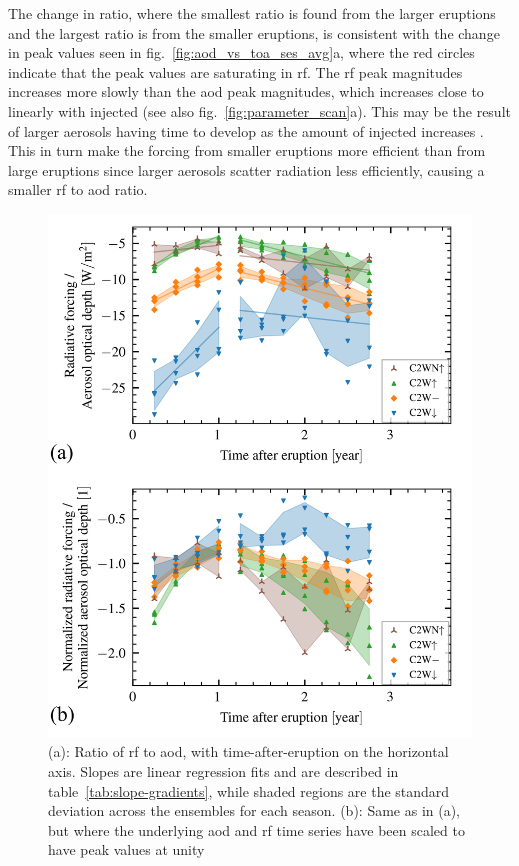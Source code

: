 \documentclass{ametsocV6.1}
\begin{document}
The change in ratio, where the smallest ratio is found from the larger eruptions and the
largest ratio is from the smaller eruptions, is consistent with the change in peak
values seen in fig.~\ref{fig:aod_vs_toa_ses_avg}a, where the red circles indicate that
the peak values are saturating in \gls{rf}. The \gls{rf} peak magnitudes increases more
slowly than the \gls{aod} peak magnitudes, which increases close to linearly with
injected  (see also fig.~\ref{fig:parameter_scan}a). This may be the result of
larger aerosols having time to develop as the amount of injected  increases
\citep{niemeier2015,marshall2019}. This in turn make the forcing from smaller eruptions
more efficient than from large eruptions since larger aerosols scatter radiation less
efficiently, causing a smaller \gls{rf} to \gls{aod} ratio.

\begin{figure}
  \centering
  \includegraphics[width=0.95\linewidth]{figures/aod_vs_toa_loop.png}

  \caption{(a): Ratio of \gls{rf} to \gls{aod}, with time-after-eruption on the horizontal
    axis. Slopes are linear regression fits and are described in
    table~\ref{tab:slope-gradients}, while shaded regions are the standard deviation across
    the ensembles for each season. (b): Same as in (a), but where the underlying \gls{aod}
    and \gls{rf} time series have been scaled to have peak values at
    unity}\label{fig:aod_vs_toa_avg_loop_ratios}%
\end{figure}
\end{document}
